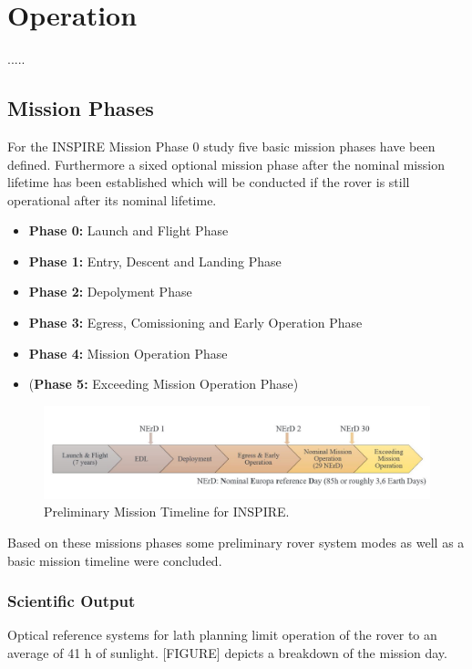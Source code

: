 \chapter{Operation}
\label{chap:Operation}
.....

\section{Mission Phases}
For the INSPIRE Mission Phase 0 study five basic mission phases have been defined. Furthermore a sixed optional mission phase after the nominal mission lifetime has been established which will be conducted if the rover is still operational after its nominal lifetime.

\begin{itemize}
\itemsep0pt
\item	\textbf{Phase 0:} Launch and Flight Phase
\item	\textbf{Phase 1:} Entry, Descent and Landing Phase
\item	\textbf{Phase 2:} Depolyment Phase
\item	\textbf{Phase 3:} Egress, Comissioning and Early Operation Phase
\item	\textbf{Phase 4:} Mission Operation Phase
\item	(\textbf{Phase 5:} Exceeding Mission Operation Phase) 
\end{itemize}

\begin{figure}[H]
{\centering
\includegraphics[width=1.0\textwidth]{Media/timeline}
\caption{Preliminary Mission Timeline for INSPIRE.}
\label{fig:timeline}
}
\end{figure}

Based on these missions phases some preliminary rover system modes as well as a basic mission timeline were concluded.

\subsection{Scientific Output}
\label{chap:sc-output}

Optical reference systems for lath planning limit operation of the rover to an average of 41 h of sunlight. [FIGURE] depicts a breakdown of the mission day. \\




